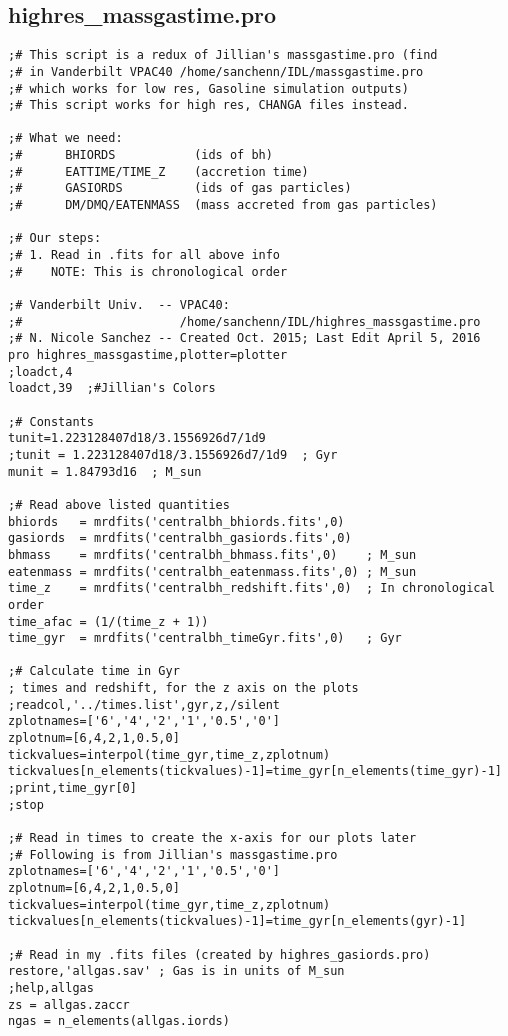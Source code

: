 \documentclass[12pt,headA,chapB]{fiskthesis}
\begin{document}
\subsection{highres\_massgastime.pro}
\begin{verbatim}
;# This script is a redux of Jillian's massgastime.pro (find
;# in Vanderbilt VPAC40 /home/sanchenn/IDL/massgastime.pro
;# which works for low res, Gasoline simulation outputs)
;# This script works for high res, CHANGA files instead.

;# What we need:
;#      BHIORDS           (ids of bh)
;#      EATTIME/TIME_Z    (accretion time)
;#      GASIORDS          (ids of gas particles) 
;#      DM/DMQ/EATENMASS  (mass accreted from gas particles)

;# Our steps:
;# 1. Read in .fits for all above info
;#    NOTE: This is chronological order

;# Vanderbilt Univ.  -- VPAC40:
;#                      /home/sanchenn/IDL/highres_massgastime.pro
;# N. Nicole Sanchez -- Created Oct. 2015; Last Edit April 5, 2016
pro highres_massgastime,plotter=plotter
;loadct,4
loadct,39  ;#Jillian's Colors

;# Constants
tunit=1.223128407d18/3.1556926d7/1d9
;tunit = 1.223128407d18/3.1556926d7/1d9  ; Gyr 
munit = 1.84793d16  ; M_sun

;# Read above listed quantities
bhiords   = mrdfits('centralbh_bhiords.fits',0)
gasiords  = mrdfits('centralbh_gasiords.fits',0)  
bhmass    = mrdfits('centralbh_bhmass.fits',0)    ; M_sun
eatenmass = mrdfits('centralbh_eatenmass.fits',0) ; M_sun
time_z    = mrdfits('centralbh_redshift.fits',0)  ; In chronological order
time_afac = (1/(time_z + 1))
time_gyr  = mrdfits('centralbh_timeGyr.fits',0)   ; Gyr

;# Calculate time in Gyr
; times and redshift, for the z axis on the plots
;readcol,'../times.list',gyr,z,/silent
zplotnames=['6','4','2','1','0.5','0']
zplotnum=[6,4,2,1,0.5,0]
tickvalues=interpol(time_gyr,time_z,zplotnum) 
tickvalues[n_elements(tickvalues)-1]=time_gyr[n_elements(time_gyr)-1]
;print,time_gyr[0]
;stop

;# Read in times to create the x-axis for our plots later
;# Following is from Jillian's massgastime.pro
zplotnames=['6','4','2','1','0.5','0']
zplotnum=[6,4,2,1,0.5,0]
tickvalues=interpol(time_gyr,time_z,zplotnum)
tickvalues[n_elements(tickvalues)-1]=time_gyr[n_elements(gyr)-1]

;# Read in my .fits files (created by highres_gasiords.pro)
restore,'allgas.sav' ; Gas is in units of M_sun
;help,allgas
zs = allgas.zaccr
ngas = n_elements(allgas.iords)


\end{verbatim}
\end{document}
